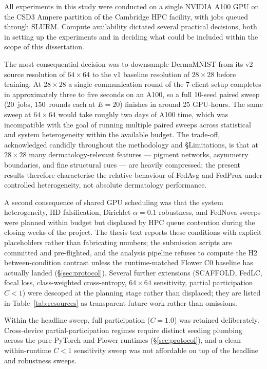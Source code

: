 \documentclass[11pt,a4paper]{article}
\newif\ifshowtodo
\newcommand{\TODOhpc}[1]{%
  \ifshowtodo\textcolor{red}{\textbf{[HPC PENDING: #1]}}\else#1\fi}
\begin{document}
All experiments in this study were conducted on a single NVIDIA A100
GPU on the CSD3 Ampere partition of the Cambridge HPC facility, with
jobs queued through SLURM. Compute availability dictated several
practical decisions, both in setting up the experiments and in
deciding what could be included within the scope of this dissertation.

The most consequential decision was to downsample DermaMNIST from its
v2 source resolution of $64 \times 64$ to the v1 baseline resolution of
$28 \times 28$ before training. At $28 \times 28$ a single
communication round of the 7-client setup completes in approximately
three to five seconds on an A100, so a full 10-seed paired sweep
(20~jobs, 150~rounds each at $E = 20$) finishes in around 25 GPU-hours.
The same sweep at $64 \times 64$ would take roughly two days of A100
time, which was incompatible with the goal of running multiple paired
sweeps across statistical and system heterogeneity within the
available budget. The trade-off, acknowledged candidly throughout the
methodology and §Limitations, is that at $28 \times 28$ many
dermatology-relevant features --- pigment networks, asymmetry
boundaries, and fine structural cues --- are heavily compressed; the
present results therefore characterise the relative behaviour of
FedAvg and FedProx under controlled heterogeneity, not absolute
dermatology performance.

A second consequence of shared GPU scheduling was that the system
heterogeneity, IID falsification, Dirichlet-$\alpha = 0.1$
robustness, and FedNova sweeps were planned within budget but
displaced by HPC queue contention during the closing weeks of the
project. The thesis text reports these conditions with explicit
\TODOhpc{} placeholders rather than fabricating numbers; the
submission scripts are committed and pre-flighted, and the analysis
pipeline refuses to compute the H2 between-condition contrast unless
the runtime-matched Flower C0 baseline has actually landed
(§\ref{sec:protocol}). Several further extensions
(SCAFFOLD, FedLC, focal loss, class-weighted cross-entropy,
$64 \times 64$ sensitivity, partial participation $C < 1$) were
descoped at the planning stage rather than displaced; they are listed
in Table~\ref{tab:resources} as transparent future work rather than
omissions.

Within the headline sweep, full participation ($C = 1.0$) was retained
deliberately. Cross-device partial-participation regimes require
distinct seeding plumbing across the pure-PyTorch and Flower runtimes
(\S\ref{sec:protocol}), and a clean within-runtime $C < 1$ sensitivity
sweep was not affordable on top of the headline and robustness sweeps.
\end{document}
